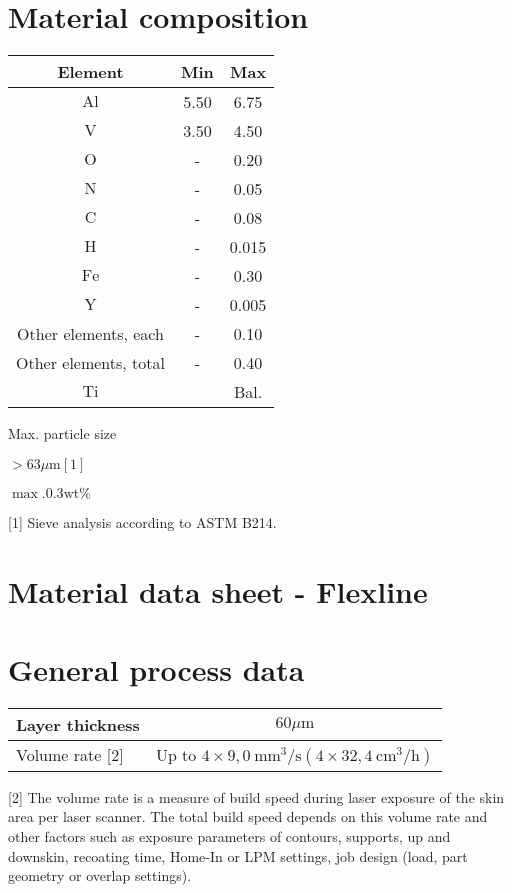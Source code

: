 \documentclass[10pt]{article}
\begin{document}
\section*{Material composition}
\begin{center}
\begin{tabular}{ccc}
Element & Min & Max \\
\hline
$\mathrm{Al}$ & 5.50 & 6.75 \\
\hline
$\mathrm{V}$ & 3.50 & 4.50 \\
\hline
$\mathrm{O}$ & - & 0.20 \\
\hline
$\mathrm{N}$ & - & 0.05 \\
\hline
$\mathrm{C}$ & - & 0.08 \\
\hline
$\mathrm{H}$ & - & 0.015 \\
\hline
$\mathrm{Fe}$ & - & 0.30 \\
\hline
$\mathrm{Y}$ & - & 0.005 \\
\hline
Other elements, each & - & 0.10 \\
\hline
Other elements, total & - & 0.40 \\
\hline
$\mathrm{Ti}$ &  & Bal. \\
\hline
\end{tabular}
\end{center}

Max. particle size

$>63 \mu \mathrm{m}[1]$

$\max .0 .3 \mathrm{wt} \%$

[1] Sieve analysis according to ASTM B214.

\section*{Material data sheet - Flexline}
\section*{General process data}
\begin{center}
\begin{tabular}{lc}
\hline
Layer thickness & $60 \mu \mathrm{m}$ \\
\hline
Volume rate [2] & Up to $4 \times 9,0 \mathrm{~mm}^{3} / \mathrm{s}\left(4 \times 32,4 \mathrm{~cm}^{3} / \mathrm{h}\right)$ \\
\hline
\end{tabular}
\end{center}

[2] The volume rate is a measure of build speed during laser exposure of the skin area per laser scanner. The total build speed depends on this volume rate and other factors such as exposure parameters of contours, supports, up and downskin, recoating time, Home-In or LPM settings, job design (load, part geometry or overlap settings).
\end{document}
